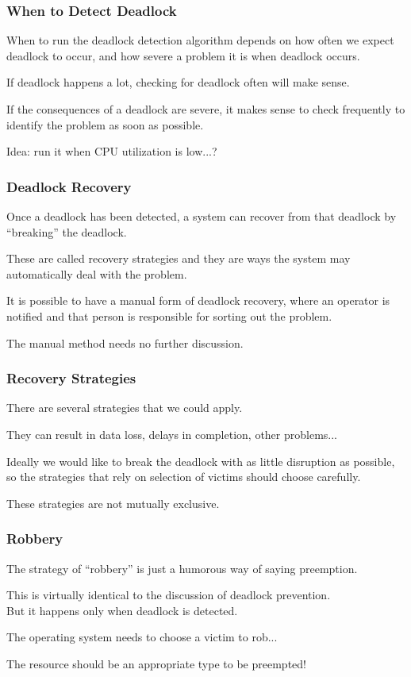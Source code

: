 \begin{frame}
\frametitle{When to Detect Deadlock}

When to run the deadlock detection algorithm depends on how often we expect deadlock to occur, and how severe a problem it is when deadlock occurs. 

If deadlock happens a lot, checking for deadlock often will make sense. 

If the consequences of a deadlock are severe, it makes sense to check frequently to identify the problem as soon as possible. 

Idea: run it when CPU utilization is low...?

\end{frame}

\begin{frame}
\frametitle{Deadlock Recovery}

Once a deadlock has been detected, a system can recover from that deadlock by ``breaking'' the deadlock. 

These are called recovery strategies and they are ways the system may automatically deal with the problem. 

It is possible to have a manual form of deadlock recovery, where an operator is notified and that person is responsible for sorting out the problem.

The manual method needs no further discussion.


\end{frame}

\begin{frame}
\frametitle{Recovery Strategies}

There are several strategies that we could apply.

They can result in data loss, delays in completion, other problems...

Ideally we would like to break the deadlock with as little disruption as possible, so the strategies that rely on selection of victims should choose carefully. 

These strategies are not mutually exclusive.

\end{frame}

\begin{frame}
\frametitle{Robbery}

The strategy of ``robbery'' is just a humorous way of saying preemption. 

This is virtually identical to the discussion of deadlock prevention.\\
\quad But it happens  only when deadlock is detected. 

The operating system needs to choose a victim to rob...

The resource should be an appropriate type to be preempted!


\end{frame}

